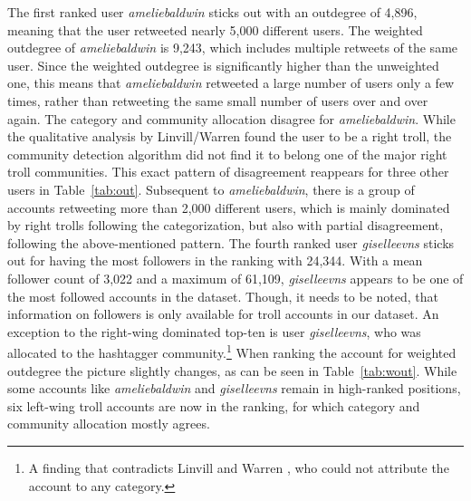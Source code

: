 \documentclass[12pt, titlepage=true, toc=bib]{scrartcl}
\begin{document}
The first ranked user \textit{ameliebaldwin} sticks out with an outdegree of 4,896, meaning that the user retweeted nearly 5,000 different users. The weighted outdegree of \textit{ameliebaldwin} is 9,243, which includes multiple retweets of the same user. Since the weighted outdegree is significantly higher than the unweighted one, this means that \textit{ameliebaldwin} retweeted a large number of users only a few times, rather than retweeting the same small number of users over and over again. The category and community allocation disagree for \textit{ameliebaldwin}. While the qualitative analysis by Linvill/Warren \cite*{linvill_troll_2018} found the user to be a right troll, the community detection algorithm did not find it to belong one of the major right troll communities. This exact pattern of disagreement reappears for three other users in Table~\ref{tab:out}. Subsequent to \textit{ameliebaldwin}, there is a group of accounts retweeting more than 2,000 different users, which is mainly dominated by right trolls following the categorization, but also with partial disagreement, following the above-mentioned pattern. The fourth ranked user \textit{giselleevns} sticks out for having the most followers in the ranking with 24,344. With a mean follower count of 3,022 and a maximum of 61,109, \textit{giselleevns} appears to be one of the most followed accounts in the dataset. Though, it needs to be noted, that information on followers is only available for troll accounts in our dataset. An exception to the right-wing dominated top-ten is user \textit{giselleevns}, who was allocated to the hashtagger community.\footnote{A finding that contradicts Linvill and Warren \cite*{linvill_troll_2018}, who could not attribute the account to any category.} When ranking the account for weighted outdegree the picture slightly changes, as can be seen in Table~\ref{tab:wout}. While some accounts like \textit{ameliebaldwin} and \textit{giselleevns} remain in high-ranked positions, six left-wing troll accounts are now in the ranking, for which category and community allocation mostly agrees.
\end{document}
